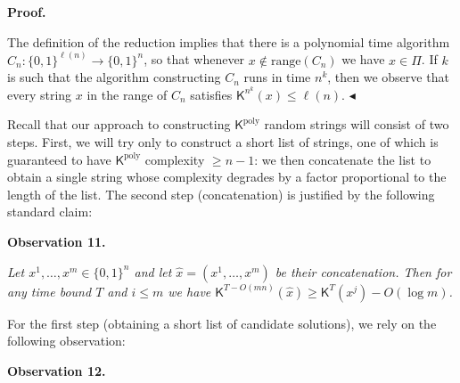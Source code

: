 


\par\medskip\noindent\textbf{Proof.}\par




The definition of the reduction implies that there is a polynomial time algorithm $C_{n}:\{0,1\}^{\ell(n)}\to\{0,1\}^{n}$, so that whenever $x\notin\mathrm{range}(C_{n})$ we have $x\in\Pi$. If $k$ is such that the algorithm constructing $C_{n}$ runs in time $n^{k}$, then we observe that every string $x$ in the range of $C_{n}$ satisfies ${\mathsf{K}}^{n^{k}}(x)\leq\ell(n)$.
$\blacktriangleleft$\par




Recall that our approach to constructing ${\mathsf{K}}^{\mathrm{poly}}$ random strings will consist of two steps. First, we will try only to construct a short list of strings, one of which is guaranteed to have ${\mathsf{K}}^{\mathrm{poly}}$ complexity $\geq n-1$: we then concatenate the list to obtain a single string whose complexity degrades by a factor proportional to the length of the list. The second step (concatenation) is justified by the following standard claim:\par





\par\medskip\noindent\textbf{
\textbf{Observation 11}\textbf{.}
}\par



\emph{Let $x^{1},\ldots,x^{m}\in\{0,1\}^{n}$ and let $\hat{x}=(x^{1},\ldots,x^{m})$ be their concatenation. Then for any time bound $T$ and $i\leq m$ we have ${\mathsf{K}}^{T-O(mn)}(\hat{x})\geq{\mathsf{K}}^{T}(x^{j})-O(\log m)$.}\par






For the first step (obtaining a short list of candidate solutions), we rely on the following observation:\par





\par\medskip\noindent\textbf{
\textbf{Observation 12}\textbf{.}
}\par



